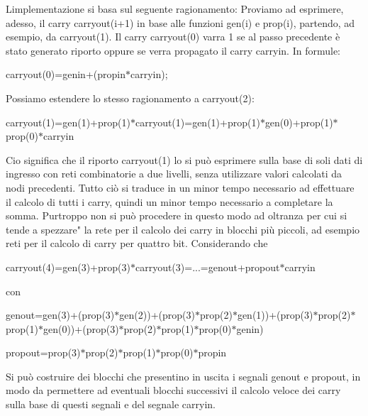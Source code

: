 \begin{DoxyCompactItemize}
\begin{DoxyCompactList}
L\textquotesingle{}implementazione si basa sul seguente ragionamento\+: Proviamo ad esprimere, adesso, il carry carryout(i+1) in base alle funzioni gen(i) e prop(i), partendo, ad esempio, da carryout(1). Il carry carryout(0) varra\textquotesingle{} 1 se al passo precedente è stato generato riporto oppure se verra\textquotesingle{} propagato il carry carryin. In formule\+: \begin{center}carryout(0)=genin+(propin$\ast$carryin);\end{center}  Possiamo estendere lo stesso ragionamento a carryout(2)\+: \begin{center}carryout(1)=gen(1)+prop(1)$\ast$carryout(1)=gen(1)+prop(1)$\ast$gen(0)+prop(1)$\ast$prop(0)$\ast$carryin\end{center}  Cio\textquotesingle{} significa che il riporto carryout(1) lo si può esprimere sulla base di soli dati di ingresso con reti combinatorie a due livelli, senza utilizzare valori calcolati da nodi precedenti. Tutto ciò si traduce in un minor tempo necessario ad effettuare il calcolo di tutti i carry, quindi un minor tempo necessario a completare la somma. Purtroppo non si può procedere in questo modo ad oltranza per cui si tende a spezzare" la rete per il calcolo dei carry in blocchi più piccoli, ad esempio reti per il calcolo di carry per quattro bit. Considerando che \begin{center}carryout(4)=gen(3)+prop(3)$\ast$carryout(3)=...=genout+propout$\ast$carryin\end{center}  con \begin{center}genout=gen(3)+(prop(3)$\ast$gen(2))+(prop(3)$\ast$prop(2)$\ast$gen(1))+(prop(3)$\ast$prop(2)$\ast$prop(1)$\ast$gen(0))+(prop(3)$\ast$prop(2)$\ast$prop(1)$\ast$prop(0)$\ast$genin)\end{center}  \begin{center}propout=prop(3)$\ast$prop(2)$\ast$prop(1)$\ast$prop(0)$\ast$propin\end{center}  Si può costruire dei blocchi che presentino in uscita i segnali genout e propout, in modo da permettere ad eventuali blocchi successivi il calcolo veloce dei carry sulla base di questi segnali e del segnale carryin. \end{DoxyCompactList}\end{DoxyCompactItemize}
